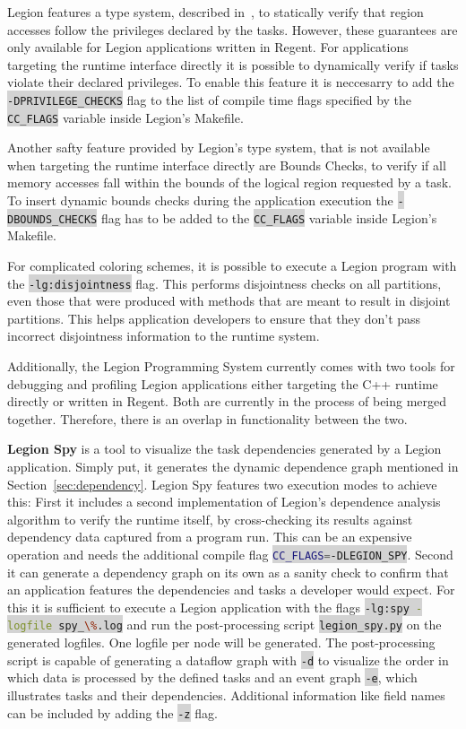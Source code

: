 \documentclass{article}      %
\newcommand{\inlinecode}[2]{\colorbox{lightgray}{\lstinline[language=#1]$#2$}}
\begin{document}
Legion features a type system, described in~\cite{LanguageSupport}, to statically verify that region accesses follow the privileges declared by the tasks. However, these guarantees are only available for Legion applications written in Regent. For applications targeting the runtime interface directly it is possible to dynamically verify if tasks violate their declared privileges. To enable this feature it is neccesarry to add the \inlinecode{Bash}{-DPRIVILEGE_CHECKS} flag to the list of compile time flags specified by the \inlinecode{Bash}{CC_FLAGS} variable inside Legion's Makefile.

Another safty feature provided by Legion's type system, that is not available when targeting the runtime interface directly are Bounds Checks, to verify if all memory accesses fall within the bounds of the logical region requested by a task. To insert dynamic bounds checks during the application execution the \inlinecode{Bash}{-DBOUNDS_CHECKS} flag has to be added to the \inlinecode{Bash}{CC_FLAGS} variable inside Legion's Makefile.

For complicated coloring schemes, it is possible to execute a Legion program with the \inlinecode{Bash}{-lg:disjointness} flag. This performs disjointness checks on all partitions, even those that were produced with methods that are meant to result in disjoint partitions. This helps application developers to ensure that they don't pass incorrect disjointness information to the runtime system.

Additionally, the Legion Programming System currently comes with two tools for debugging and profiling Legion applications either targeting the C++ runtime directly or written in Regent. Both are currently in the process of being merged together. Therefore, there is an overlap in functionality between the two.

\textbf{Legion Spy} is a tool to visualize the task dependencies generated by a Legion application. Simply put, it generates the dynamic dependence graph mentioned in Section~\ref{sec:dependency}. Legion Spy features two execution modes to achieve this: First it includes a second implementation of Legion's dependence analysis algorithm to verify the runtime itself, by cross-checking its results against dependency data captured from a program run. This can be an expensive operation and needs the additional compile flag \inlinecode{Bash}{CC_FLAGS=-DLEGION_SPY}. Second it can generate a dependency graph on its own as a sanity check to confirm that an application features the dependencies and tasks a developer would expect. For this it is sufficient to execute a Legion application with the flags \inlinecode{Bash}{-lg:spy -logfile spy_\%.log} and run the post-processing script \inlinecode{Bash}{legion_spy.py} on the generated logfiles. One logfile per node will be generated.
The post-processing script is capable of generating a dataflow graph with \inlinecode{Bash}{-d} to visualize the order in which data is processed by the defined tasks and an event graph \inlinecode{Bash}{-e}, which illustrates tasks and their dependencies. Additional information like field names can be included by adding the \inlinecode{Bash}{-z} flag.
\end{document}
